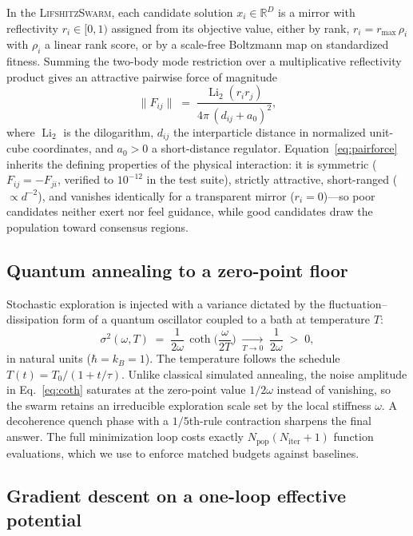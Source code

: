 \documentclass[10pt,twocolumn]{article}
\newcommand{\Li}{\operatorname{Li}}
\begin{document}
In the \textsc{LifshitzSwarm}, each candidate solution $x_i \in \mathbb{R}^D$ is a mirror with
reflectivity $r_i \in [0,1)$ assigned from its objective value, either by rank,
$r_i = r_{\max}\,\rho_i$ with $\rho_i$ a linear rank score, or by a scale-free Boltzmann map on
standardized fitness. Summing the two-body mode restriction over a multiplicative reflectivity
product gives an attractive pairwise force of magnitude
\begin{equation}
\lVert F_{ij}\rVert \;=\; \frac{\Li_2(r_i r_j)}{4\pi \,(d_{ij}+a_0)^2},
\label{eq:pairforce}
\end{equation}
where $\Li_2$ is the dilogarithm, $d_{ij}$ the interparticle distance in normalized unit-cube
coordinates, and $a_0>0$ a short-distance regulator. Equation~\eqref{eq:pairforce} inherits the
defining properties of the physical interaction: it is symmetric
($F_{ij}=-F_{ji}$, verified to $10^{-12}$ in the test suite), strictly attractive, short-ranged
($\propto d^{-2}$), and vanishes identically for a transparent mirror ($r_i = 0$)---so poor
candidates neither exert nor feel guidance, while good candidates draw the population toward
consensus regions.

\subsection{Quantum annealing to a zero-point floor}
\label{sec:annealing}

Stochastic exploration is injected with a variance dictated by the fluctuation--dissipation
form of a quantum oscillator coupled to a bath at temperature $T$:
\begin{equation}
\sigma^2(\omega, T) \;=\; \frac{1}{2\omega}\,
\coth\!\Big(\frac{\omega}{2T}\Big)
\;\xrightarrow[T\to 0]{}\; \frac{1}{2\omega} \;>\; 0 ,
\label{eq:coth}
\end{equation}
in natural units ($\hbar = k_B = 1$). The temperature follows the schedule
$T(t) = T_0/(1+t/\tau)$. Unlike classical simulated annealing, the noise amplitude in
Eq.~\eqref{eq:coth} saturates at the zero-point value $1/2\omega$ instead of vanishing, so the
swarm retains an irreducible exploration scale set by the local stiffness $\omega$. A
decoherence quench phase with a $1/5$th-rule contraction sharpens the final answer. The full
minimization loop costs exactly $N_{\mathrm{pop}}(N_{\mathrm{iter}}+1)$ function evaluations,
which we use to enforce matched budgets against baselines.

\subsection{Gradient descent on a one-loop effective potential}
\label{sec:torch}
\end{document}
